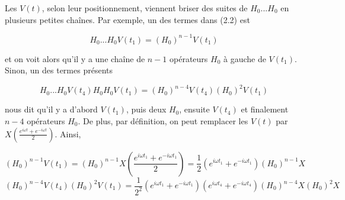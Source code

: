 Les $V(t)$, selon leur positionnement, viennent briser des suites de $H_0...H_0$ en plusieurs petites chaînes. Par exemple, un des termes dans (2.2) est 

\begin{equation*}
    H_0...H_0V(t_1) = (H_0)^{n-1}V(t_1)    
\end{equation*}

et on voit alors qu'il y a une chaîne de $n-1$ opérateurs $H_0$ à gauche de $V(t_1)$. Sinon, un des termes présents

\begin{equation*}
    H_0...H_0V(t_4)H_0H_0V(t_1) = (H_0)^{n-4}V(t_4)(H_0)^2V(t_1)    
\end{equation*}

nous dit qu'il y a d'abord $V(t_1)$, puis deux $H_0$, ensuite $V(t_4)$ et finalement $n-4$ opérateurs $H_0$. De plus, par définition, on peut remplacer les $V(t)$ par $X\left(\frac{e^{i \omega t} + e^{-i\omega t}}{2}\right)$. Ainsi,

\begin{equation*}
    (H_0)^{n-1}V(t_1) = (H_0)^{n-1}X\left(\frac{e^{i \omega t_1} + e^{-i\omega t_1}}{2}\right) = \frac{1}{2}\left(e^{i \omega t_1} + e^{-i\omega t_1}\right)(H_0)^{n-1}X
\end{equation*}
\begin{equation*}
    (H_0)^{n-4}V(t_4)(H_0)^2V(t_1) = \frac{1}{2^2}\left(e^{i \omega t_1} + e^{-i\omega t_1}\right)\left(e^{i \omega t_4} + e^{-i\omega t_4}\right)(H_0)^{n-4}X(H_0)^2X
\end{equation*}








